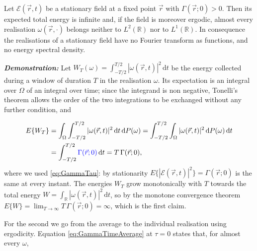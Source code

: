 		\begin{myteo}
			Let $\mathcal{E}(\vec{r},t)$ be a stationary field at a fixed point $\vec{r}$ with
			$\Gamma(\vec{r};0)>0$. Then its expected total energy is infinite and, if the field is
			moreover ergodic, almost every realisation $\omega(\vec{r},\cdot)$ belongs neither to
			$L^{2}(\mathbb{R})$ nor to $L^{1}(\mathbb{R})$. In consequence the realisations of a
			stationary field have no Fourier transform as functions, and no energy spectral
			density.
		\end{myteo}

		\textbf{\textit{Demonstration:}} Let
		$W_{T}(\omega)=\int_{-T/2}^{T/2}|\omega(\vec{r},t)|^{2}\,\mathrm{d}t$ be the energy
		collected during a window of duration $T$ in the realisation $\omega$. Its expectation is
		an integral over $\Omega$ of an integral over time; since the integrand is non negative,
		Tonelli's theorem allows the order of the two integrations to be exchanged without any
		further condition, and

		\begin{align}
			E\{W_{T}\} &= \int_{\Omega}\int_{-T/2}^{T/2}|\omega(\vec{r},t)|^{2}\,\mathrm{d}t\,\mathrm{d}P(\omega)
			= \int_{-T/2}^{T/2}\int_{\Omega}|\omega(\vec{r},t)|^{2}\,\mathrm{d}P(\omega)\,\mathrm{d}t \nonumber\\
			&= \int_{-T/2}^{T/2}\textcolor{blue}{\Gamma(\vec{r};0)}\,\mathrm{d}t = T\,\Gamma(\vec{r};0),
		\end{align}
		where we used \eqref{eq:GammaTau}: by stationarity
		$E\{|\mathcal{E}(\vec{r},t)|^{2}\}=\Gamma(\vec{r};0)$ is the same at every instant. The
		energies $W_{T}$ grow monotonically with $T$ towards the total energy
		$W=\int_{\mathbb{R}}|\omega(\vec{r},t)|^{2}\,\mathrm{d}t$, so by the monotone convergence
		theorem $E\{W\}=\lim_{T\to\infty}T\,\Gamma(\vec{r};0)=\infty$, which is the first claim.

		For the second we go from the average to the individual realisation using ergodicity.
		Equation \eqref{eq:GammaTimeAverage} at $\tau=0$ states that, for almost every $\omega$,

